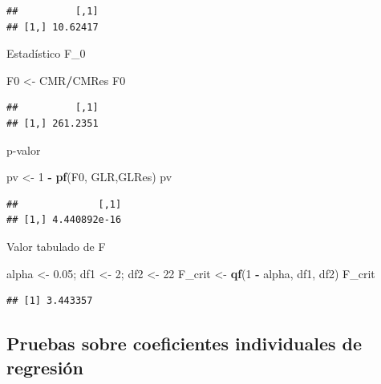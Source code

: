 \documentclass[
]{book}
\newenvironment{Shaded}{\begin{snugshade}}{\end{snugshade}}
\newcommand{\DecValTok}[1]{\textcolor[rgb]{0.00,0.00,0.81}{#1}}
\newcommand{\FloatTok}[1]{\textcolor[rgb]{0.00,0.00,0.81}{#1}}
\newcommand{\FunctionTok}[1]{\textcolor[rgb]{0.13,0.29,0.53}{\textbf{#1}}}
\newcommand{\NormalTok}[1]{#1}
\newcommand{\OtherTok}[1]{\textcolor[rgb]{0.56,0.35,0.01}{#1}}
\newcommand{\SpecialCharTok}[1]{\textcolor[rgb]{0.81,0.36,0.00}{\textbf{#1}}}
\begin{document}
\begin{verbatim}
##          [,1]
## [1,] 10.62417
\end{verbatim}

Estadístico F\_0

\begin{Shaded}
\begin{Highlighting}[]
\NormalTok{F0 }\OtherTok{\textless{}{-}}\NormalTok{ CMR}\SpecialCharTok{/}\NormalTok{CMRes}
\NormalTok{F0}
\end{Highlighting}
\end{Shaded}

\begin{verbatim}
##          [,1]
## [1,] 261.2351
\end{verbatim}

p-valor

\begin{Shaded}
\begin{Highlighting}[]
\NormalTok{pv }\OtherTok{\textless{}{-}} \DecValTok{1} \SpecialCharTok{{-}} \FunctionTok{pf}\NormalTok{(F0, GLR,GLRes)}
\NormalTok{pv}
\end{Highlighting}
\end{Shaded}

\begin{verbatim}
##              [,1]
## [1,] 4.440892e-16
\end{verbatim}

Valor tabulado de F

\begin{Shaded}
\begin{Highlighting}[]
\NormalTok{alpha }\OtherTok{\textless{}{-}} \FloatTok{0.05}\NormalTok{; df1 }\OtherTok{\textless{}{-}} \DecValTok{2}\NormalTok{; df2 }\OtherTok{\textless{}{-}} \DecValTok{22}
\NormalTok{F\_crit }\OtherTok{\textless{}{-}} \FunctionTok{qf}\NormalTok{(}\DecValTok{1} \SpecialCharTok{{-}}\NormalTok{ alpha, df1, df2)}
\NormalTok{F\_crit}
\end{Highlighting}
\end{Shaded}

\begin{verbatim}
## [1] 3.443357
\end{verbatim}

\subsection{Pruebas sobre coeficientes individuales de regresión}\label{pruebas-sobre-coeficientes-individuales-de-regresiuxf3n}
\end{document}
